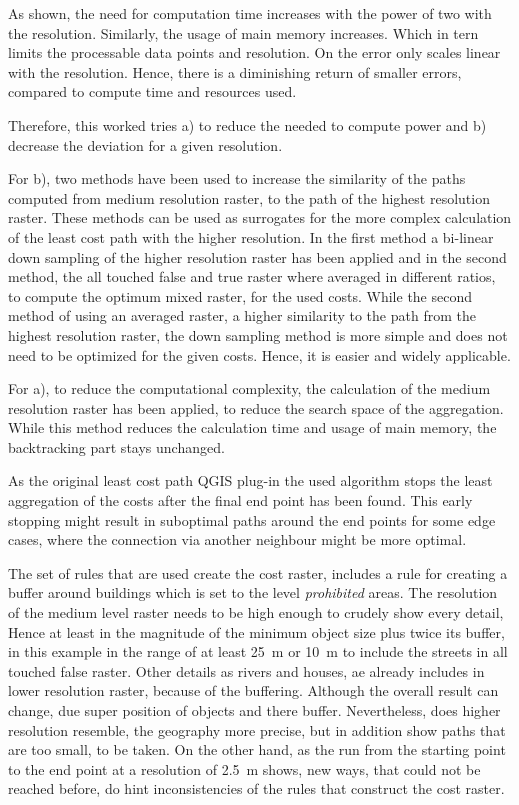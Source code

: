 As shown, the need for computation time increases with the power of two with the resolution. 
Similarly, the usage of main memory increases. 
Which in tern limits the processable data points and resolution.
On the error only scales linear with the resolution. 
Hence, there is a diminishing return of smaller errors, compared to compute time and resources used.

Therefore, this worked tries a) to reduce the needed to compute power and b) decrease the deviation for a given resolution.

For b), two methods have been used to increase the similarity of the paths computed from medium resolution raster, to the path of the highest resolution raster.
These methods can be used as surrogates for the more complex calculation of the least cost path with the higher resolution.
In the first method a bi-linear down sampling of the higher resolution raster has been applied and in the second method, the all touched false and true raster where averaged in different ratios, to compute the optimum mixed raster, for the used costs.
While the second method of using an averaged raster, a higher similarity to the path from the highest resolution raster, the down sampling method is more
simple and does not need to be optimized for the given costs.
Hence, it is easier and widely applicable.

For a), to reduce the computational complexity, the calculation of the medium resolution raster has been applied, to reduce the search space of the aggregation.
While this method reduces the calculation time and usage of main memory, the backtracking part stays unchanged.



As the original least cost path QGIS plug-in the used algorithm stops the least aggregation of the costs after the final end point has been found.
This early stopping might result in suboptimal paths around the end points for some edge cases, where the connection via another neighbour might be more optimal.

The set of rules that are used create the cost raster, includes a rule for creating a buffer around buildings  which is set to the level \textit{prohibited} areas.
The resolution of the medium level raster needs to be high enough to crudely show every detail, Hence at least in the magnitude of the minimum object size plus twice its buffer, in this example in the range of at least 25~m or 10~m to include the streets in all touched false raster.
Other details as rivers and houses, ae already includes in lower resolution raster, because of the buffering.
Although the overall result can change, due super position of objects and there buffer.
Nevertheless, does higher resolution resemble, the geography more precise, but in addition show paths that are too small, to be taken.
On the other hand, as the run from the starting point to the end point at a resolution of 2.5~m shows, new ways, that could not be reached before, do hint inconsistencies of the rules that construct the cost raster.

